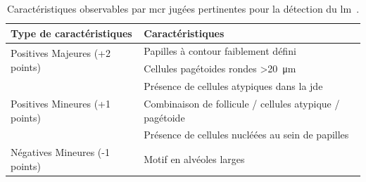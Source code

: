 \begin{table}[H]
\centering
    \begin{tabular}{ll}
        \toprule
        Type de caractéristiques                        & Caractéristiques                                              \\\hline
        \multirow{2}{*}{Positives Majeures (+2 points)} & Papilles à contour faiblement défini                         \\\cline{2-2}
                                                        & Cellules pagétoides rondes >\SI{20}{\micro\metre}             \\\midrule
        \multirow{3}{*}{Positives Mineures (+1 points)} & Présence de cellules atypiques dans la \gls{jde}              \\\cline{2-2}
                                                        & Combinaison de follicule / cellules atypique / pagétoide      \\\cline{2-2}
                                                        & Présence de cellules nucléées au sein de papilles             \\\midrule
        Négatives Mineures (-1 points)                  & Motif en alvéoles larges                                      \\\bottomrule
    \end{tabular}
    \caption{Caractéristiques observables par \gls{mcr} jugées pertinentes pour la détection du \gls{lm}~\cite{Guitera2010}.}
    \label{tab:rcm_algorithm_lentigo}
\end{table}\par
 
